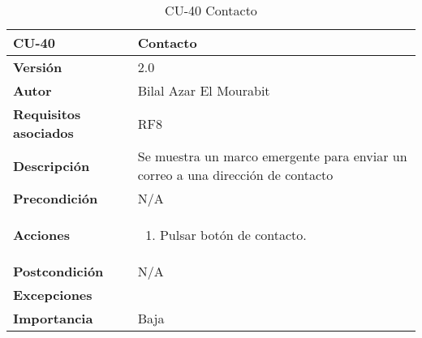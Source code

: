 \begin{table}[H]
	\centering
	\begin{tabularx}{\linewidth}{ p{} p{} }
		\toprule
		\textbf{CU-40}    & \textbf{Contacto}\\
		\toprule
		\textbf{Versión}              & 2.0    \\
		\textbf{Autor}                & Bilal Azar El Mourabit \\
		\textbf{Requisitos asociados} & RF8\\
		\textbf{Descripción}          & Se muestra un marco emergente para enviar un correo a una dirección de contacto\\
    		\textbf{Precondición}         & N/A\\
		\textbf{Acciones}             & 
		\begin{enumerate}
			\def\labelenumi{\arabic{enumi}.}
			\tightlist
			\item Pulsar botón de contacto.
		\end{enumerate}\\
		\textbf{Postcondición}        & N/A \\
		\textbf{Excepciones}          &  \\
		\textbf{Importancia}          & Baja \\
		\bottomrule
	\end{tabularx}
	\caption{CU-40 Contacto}
\end{table}